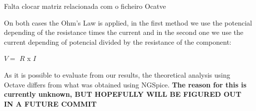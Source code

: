 \vspace{1cm}

Falta clocar matriz relacionada com o ficheiro Ocatve 

\vspace {1cm}

On both cases the Ohm's Law is applied, in the first method we use the potencial depending of the resistance times the current and in the second one we use the current depending of potencial divided by the resistance of the component: 

\vspace{1cm}

$V =$  $R$ x $I$ 
\vspace{1cm} 

As it is possible to evaluate from our results, the theoretical analysis using Octave differs from what was obtained using NGSpice. \textbf{The reason for this is currently unknown, BUT HOPEFULLY WILL BE FIGURED OUT IN A FUTURE COMMIT}
